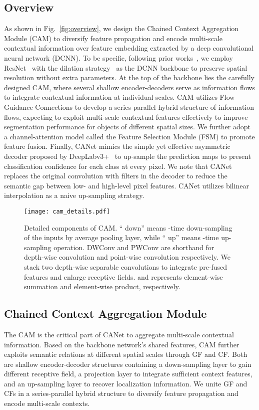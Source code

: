 \documentclass[journal]{IEEEtran}
\begin{document}
\subsection{Overview}
As shown in Fig.~\ref{fig:overview}, we design the Chained Context Aggregation Module (CAM) to diversify feature propagation and encode multi-scale contextual information over feature embedding extracted by a deep convolutional neural network (DCNN). To be specific, following prior works~\cite{zhao2017pyramid,zhang2018context,chen2017rethinking}, we employ ResNet~\cite{he2016deep} with the dilation strategy~\cite{chen2014semantic} as the DCNN backbone to preserve spatial resolution without extra parameters. At the top of the backbone lies the carefully designed CAM, where several shallow encoder-decoders serve as information flows to integrate contextual information at individual scales. CAM utilizes Flow Guidance Connections to develop a series-parallel hybrid structure of information flows, expecting to exploit multi-scale contextual features effectively to improve segmentation performance for objects of different spatial sizes. We further adopt a channel-attention model called the Feature Selection Module (FSM) to promote feature fusion. Finally, CANet mimics the simple yet effective asymmetric decoder proposed by DeepLabv3+~\cite{chen2018encoder} to up-sample the prediction maps to present classification confidence for each class at every pixel. We note that CANet replaces the original  convolution with  filters in the decoder to reduce the semantic gap between low- and high-level pixel features. CANet utilizes bilinear interpolation as a naive up-sampling strategy.



\begin{figure}[t]
\begin{center}
\texttt{[image: cam\_details.pdf]}
\end{center}
\caption{Detailed components of CAM. `` down'' means -time down-sampling of the inputs by average pooling layer, while `` up'' means -time up-sampling operation. DWConv and PWConv are shorthand for depth-wise convolution and point-wise convolution respectively. We stack two depth-wise separable convolutions to integrate pre-fused features and enlarge receptive fields.  and  represents element-wise summation and element-wise product, respectively.}
\label{fig:cam_details}
\end{figure}

\subsection{Chained Context Aggregation Module}
The CAM is the critical part of CANet to aggregate multi-scale contextual information. Based on the backbone network's shared features, CAM further exploits semantic relations at different spatial scales through GF and CF. Both are shallow encoder-decoder structures containing a down-sampling layer to gain different receptive field, a projection layer to integrate sufficient context features, and an up-sampling layer to recover localization information. We unite GF and CFs in a series-parallel hybrid structure to diversify feature propagation and encode multi-scale contexts.
\end{document}

